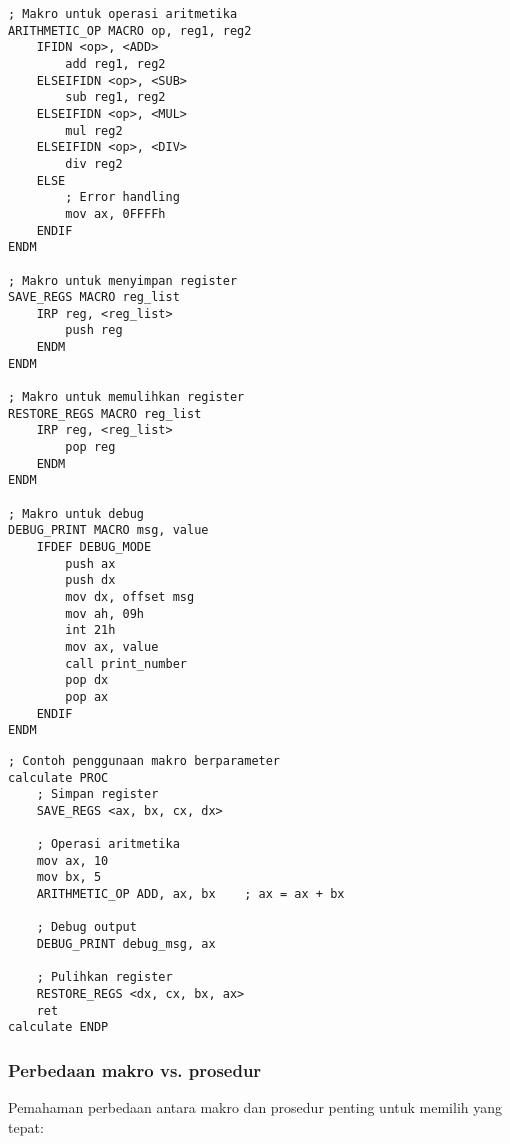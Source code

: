 \documentclass[../main.tex]{subfiles}
\begin{document}
                \begin{lstlisting}[language={[x86masm]Assembler}, caption=Makro Berparameter, label={lst:parameterized-macro}]
; Makro untuk operasi aritmetika
ARITHMETIC_OP MACRO op, reg1, reg2
    IFIDN <op>, <ADD>
        add reg1, reg2
    ELSEIFIDN <op>, <SUB>
        sub reg1, reg2
    ELSEIFIDN <op>, <MUL>
        mul reg2
    ELSEIFIDN <op>, <DIV>
        div reg2
    ELSE
        ; Error handling
        mov ax, 0FFFFh
    ENDIF
ENDM

; Makro untuk menyimpan register
SAVE_REGS MACRO reg_list
    IRP reg, <reg_list>
        push reg
    ENDM
ENDM

; Makro untuk memulihkan register
RESTORE_REGS MACRO reg_list
    IRP reg, <reg_list>
        pop reg
    ENDM
ENDM

; Makro untuk debug
DEBUG_PRINT MACRO msg, value
    IFDEF DEBUG_MODE
        push ax
        push dx
        mov dx, offset msg
        mov ah, 09h
        int 21h
        mov ax, value
        call print_number
        pop dx
        pop ax
    ENDIF
ENDM
                \end{lstlisting}

                \begin{lstlisting}[language={[x86masm]Assembler}, caption=Penggunaan Makro Berparameter, label={lst:macro-usage}]
; Contoh penggunaan makro berparameter
calculate PROC
    ; Simpan register
    SAVE_REGS <ax, bx, cx, dx>
    
    ; Operasi aritmetika
    mov ax, 10
    mov bx, 5
    ARITHMETIC_OP ADD, ax, bx    ; ax = ax + bx
    
    ; Debug output
    DEBUG_PRINT debug_msg, ax
    
    ; Pulihkan register
    RESTORE_REGS <dx, cx, bx, ax>
    ret
calculate ENDP
                \end{lstlisting}

            \subsubsection{Perbedaan makro vs. prosedur}
                Pemahaman perbedaan antara makro dan prosedur penting untuk memilih yang tepat:
\end{document}
